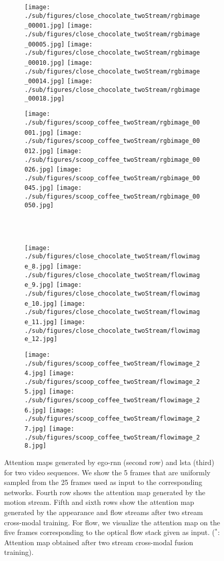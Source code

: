 \documentclass[10pt,twocolumn,letterpaper]{article}
\begin{document}
\begin{figure*}[t]
        \begin{subfigure}[b]{0.4\textwidth}
			\texttt{[image: ./sub/figures/close\_chocolate\_twoStream/rgbimage\_00001.jpg]}
			\texttt{[image: ./sub/figures/close\_chocolate\_twoStream/rgbimage\_00005.jpg]}
			\texttt{[image: ./sub/figures/close\_chocolate\_twoStream/rgbimage\_00010.jpg]}
			\texttt{[image: ./sub/figures/close\_chocolate\_twoStream/rgbimage\_00014.jpg]}
			\texttt{[image: ./sub/figures/close\_chocolate\_twoStream/rgbimage\_00018.jpg]}
			\end{subfigure} \hskip 5mm
	        \begin{subfigure}[b]{0.4\textwidth}
			\texttt{[image: ./sub/figures/scoop\_coffee\_twoStream/rgbimage\_00001.jpg]}
			\texttt{[image: ./sub/figures/scoop\_coffee\_twoStream/rgbimage\_00012.jpg]}
			\texttt{[image: ./sub/figures/scoop\_coffee\_twoStream/rgbimage\_00026.jpg]}
			\texttt{[image: ./sub/figures/scoop\_coffee\_twoStream/rgbimage\_00045.jpg]}
			\texttt{[image: ./sub/figures/scoop\_coffee\_twoStream/rgbimage\_00050.jpg]}
		\end{subfigure} \\
	 \	
       \begin{subfigure}[b]{0.4\textwidth}
			\texttt{[image: ./sub/figures/close\_chocolate\_twoStream/flowimage\_8.jpg]}
			\texttt{[image: ./sub/figures/close\_chocolate\_twoStream/flowimage\_9.jpg]}
			\texttt{[image: ./sub/figures/close\_chocolate\_twoStream/flowimage\_10.jpg]}
			\texttt{[image: ./sub/figures/close\_chocolate\_twoStream/flowimage\_11.jpg]}
			\texttt{[image: ./sub/figures/close\_chocolate\_twoStream/flowimage\_12.jpg]}
			\end{subfigure} \hskip 5mm
	        \begin{subfigure}[b]{0.4\textwidth}
			\texttt{[image: ./sub/figures/scoop\_coffee\_twoStream/flowimage\_24.jpg]}
			\texttt{[image: ./sub/figures/scoop\_coffee\_twoStream/flowimage\_25.jpg]}
			\texttt{[image: ./sub/figures/scoop\_coffee\_twoStream/flowimage\_26.jpg]}
			\texttt{[image: ./sub/figures/scoop\_coffee\_twoStream/flowimage\_27.jpg]}
			\texttt{[image: ./sub/figures/scoop\_coffee\_twoStream/flowimage\_28.jpg]}
		\end{subfigure}
\caption{Attention maps generated by ego-rnn (second row) and \ac{lsta} (third) for two video sequences. We show the 5 frames that are uniformly sampled from the 25 frames used as input to the corresponding networks. Fourth row shows the attention map generated by the motion stream. Fifth and sixth rows show the attention map generated by the appearance and flow streams after two stream cross-modal training. For flow, we visualize the attention map on the five frames corresponding to the optical flow stack given as input. ($^*$: Attention map obtained after two stream cross-modal fusion training).}
\label{fig:att_map}
	\end{figure*}\vspace{-0.1cm}
\end{document}
